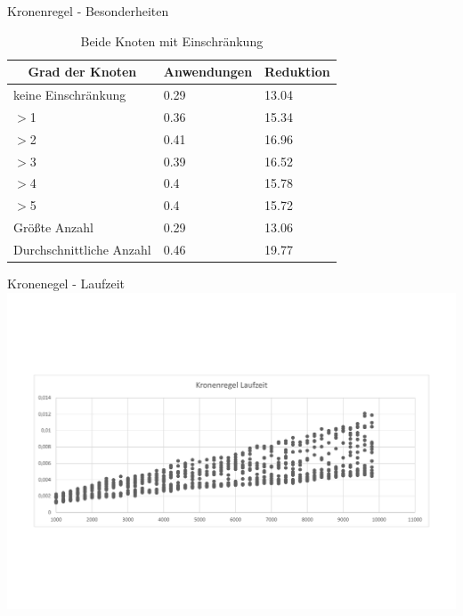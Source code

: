 \documentclass{beamer}
\begin{document}
\begin{frame}{Kronenregel - Besonderheiten}
\begin{table}[htb]
\caption{Beide Knoten mit Einschränkung\label{tab:degreeAND}}
\vspace*{1em}
\centering

\bgroup
\def\arraystretch{1.3}%

\begin{tabular}[c]{l|l|l}
	
	\multicolumn{1}{c|}{\textbf{Grad der Knoten}} & 
	\multicolumn{1}{c|}{\textbf{Anwendungen}} & 
	\multicolumn{1}{c}{\textbf{Reduktion}} \\ 
	
	\hline

	keine Einschränkung&0.29&13.04\\
	$>$1&0.36 &15.34 \\
	$>$2&0.41 &16.96 \\
	$>$3& 0.39& 16.52 \\
	$>$4& 0.4 &15.78 \\
	$>$5& 0.4 & 15.72\\ \pause
	Größte Anzahl& 0.29 &13.06 \\
	Durchschnittliche Anzahl& 0.46&19.77 \\
	
\end{tabular}
\egroup

\end{table}
\end{frame}

\begin{frame}{Kronenegel - Laufzeit}
\includegraphics[scale= .4]{analysis1000_CrownNormal_runtime.pdf} 
\end{frame}
\end{document}
